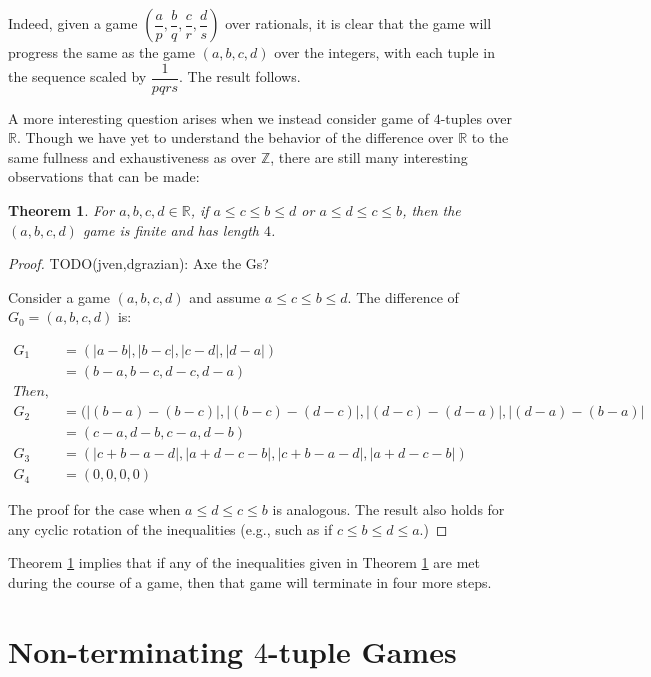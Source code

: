 \documentclass[12pt]{amsart}
\newtheorem{theorem}{Theorem}[section]
\begin{document}
Indeed, given a game $\left(\dfrac{a}{p}, \dfrac{b}{q}, \dfrac{c}{r}, \dfrac{d}{s}\right)$ over rationals, it is clear that the game will progress the same as the game $(a, b, c, d)$ over the integers, with each tuple in the sequence scaled by $\dfrac{1}{pqrs}$. The result follows.

A more interesting question arises when we instead consider game of $4$-tuples over $\mathbb{R}$. Though we have yet to understand the behavior of the difference over $\mathbb{R}$ to the same fullness and exhaustiveness as over $\mathbb{Z}$, there are still many interesting observations that can be made:

\begin{theorem}
\label{thm:inequalities}
For $a,b,c,d\in \mathbb{R}$, if $a \leq c \leq b \leq d$ or $a \leq d \leq c \leq b$, then the $(a,b,c,d)$ game is finite and has length $4$. 
\end{theorem}

\begin{proof}

TODO(jven,dgrazian): Axe the Gs?

Consider a game $(a,b,c,d)$ and assume $a \leq c \leq b \leq d$. The difference of $G_0 =  (a, b, c, d)$ is:

\begin{align*}
G_1 &= (|a-b|, |b-c|, |c-d|, |d-a|) \\
&=(b-a, b-c, d-c, d-a)\\
Then, \\
G_2 &= (|(b-a) - (b-c)|, |(b-c) - (d-c)|, |(d-c) - (d-a)|, |(d-a) - (b-a)| \\
&= (c-a, d-b, c-a, d-b)\\
G_3 &= (|c + b - a - d|, |a + d - c - b|, |c + b - a - d|, |a + d - c - b|)\\
G_4 &= (0,0,0,0)
\end{align*}

The proof for the case when $a \leq d \leq c \leq b$ is analogous. The result also holds for any cyclic rotation of the inequalities (e.g., such as if $c \leq b \leq d \leq a$.)
\end{proof}

Theorem \ref{thm:inequalities} implies that if any of the inequalities given in Theorem \ref{thm:inequalities} are met during the course of a game, then that game will terminate in four more steps.

\section{Non-terminating $4$-tuple Games\label{sec:nonterminating}}
\end{document}
